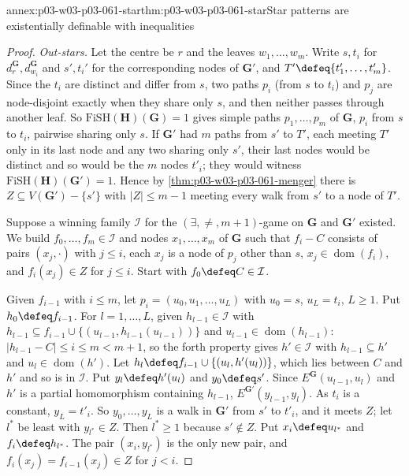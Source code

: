 \begin{annexitem}{annex:p03-w03-p03-061-star}{thm:p03-w03-p03-061-star}{Star patterns are existentially definable with inequalities}
\begin{proof}
\emph{Out-stars.} Let the centre be \(r\) and the leaves \(w_1,\ldots,w_m\).
Write \(s,t_i\) for \(d_r^{\mathbf G},d_{w_i}^{\mathbf G}\) and
\(s',t_i'\) for the corresponding nodes of \(\mathbf G'\), and
\(T'\defeq\{t'_1,\ldots,t'_m\}\). Since the \(t_i\) are distinct and differ
from \(s\), two paths \(p_i\) (from \(s\) to \(t_i\)) and \(p_j\) are
node-disjoint exactly when they share only \(s\), and then neither passes
through another leaf. So \(\mathrm{FiSH}(\mathbf H)(\mathbf G)=1\) gives
simple paths \(p_1,\ldots,p_m\) of \(\mathbf G\), \(p_i\) from \(s\) to
\(t_i\), pairwise sharing only \(s\). If \(\mathbf G'\) had \(m\) paths from
\(s'\) to \(T'\), each meeting \(T'\) only in its last node and any two
sharing only \(s'\), their last nodes would be distinct and so would be the
\(m\) nodes \(t'_i\); they would witness
\(\mathrm{FiSH}(\mathbf H)(\mathbf G')=1\). Hence by
\cref{thm:p03-w03-p03-061-menger} there is \(Z\subseteq V(\mathbf
G')-\{s'\}\) with \(|Z|\le m-1\) meeting every walk from \(s'\) to a node of
\(T'\).

Suppose a winning family \(\mathcal I\) for the \((\exists,\neq,m+1)\)-game on
\(\mathbf G\) and \(\mathbf G'\) existed. We build \(f_0,\ldots,f_m\in
\mathcal I\) and nodes \(x_1,\ldots,x_m\) of \(\mathbf G\) such that
\(f_i-C\) consists of pairs \((x_j,\cdot)\) with \(j\le i\), each \(x_j\) is a
node of \(p_j\) other than \(s\), \(x_j\in\operatorname{dom}(f_i)\), and
\(f_i(x_j)\in Z\) for \(j\le i\). Start with \(f_0\defeq C\in\mathcal I\).

Given \(f_{i-1}\) with \(i\le m\), let \(p_i=(u_0,u_1,\ldots,u_L)\) with
\(u_0=s\), \(u_L=t_i\), \(L\ge1\). Put \(h_0\defeq f_{i-1}\). For
\(l=1,\ldots,L\), given \(h_{l-1}\in\mathcal I\) with
\(h_{l-1}\subseteq f_{i-1}\cup\{(u_{l-1},h_{l-1}(u_{l-1}))\}\) and
\(u_{l-1}\in\operatorname{dom}(h_{l-1})\): \(|h_{l-1}-C|\le i\le m<m+1\), so
the forth property gives \(h'\in\mathcal I\) with \(h_{l-1}\subseteq h'\)
and \(u_l\in\operatorname{dom}(h')\). Let \(h_l\defeq f_{i-1}\cup
\{(u_l,h'(u_l))\}\), which lies between \(C\) and \(h'\) and so is in
\(\mathcal I\). Put \(y_l\defeq h'(u_l)\) and \(y_0\defeq s'\). Since
\(E^{\mathbf G}(u_{l-1},u_l)\) and \(h'\) is a partial homomorphism containing
\(h_{l-1}\), \(E^{\mathbf G'}(y_{l-1},y_l)\). As \(t_i\) is a constant,
\(y_L=t'_i\). So \(y_0,\ldots,y_L\) is a walk in \(\mathbf G'\) from \(s'\)
to \(t'_i\), and it meets \(Z\); let \(l^*\) be least with \(y_{l^*}\in Z\).
Then \(l^*\ge1\) because \(s'\notin Z\). Put \(x_i\defeq u_{l^*}\) and
\(f_i\defeq h_{l^*}\). The pair \((x_i,y_{l^*})\) is the only new pair, and
\(f_i(x_j)=f_{i-1}(x_j)\in Z\) for \(j<i\).


\end{proof}
\end{annexitem}
